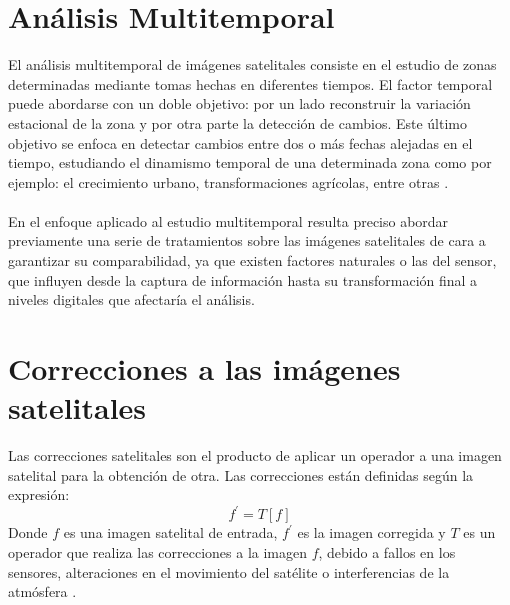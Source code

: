 \section{An\'alisis Multitemporal}
El an\'alisis multitemporal de im\'agenes satelitales consiste en el estudio de zonas determinadas mediante tomas hechas en diferentes tiempos. El factor temporal puede abordarse con un doble objetivo: por un lado reconstruir la variaci\'on estacional de la zona y por otra parte la detecci\'on de cambios. Este \'ultimo objetivo se enfoca en detectar cambios entre dos o m\'as
fechas alejadas en el tiempo, estudiando el dinamismo temporal de una determinada zona como por ejemplo: el crecimiento urbano, transformaciones agr\'icolas, entre otras \cite{salinero2002teledeteccion}.\\~\\
En el enfoque aplicado al estudio multitemporal resulta preciso abordar previamente una serie de tratamientos sobre las im\'agenes satelitales de cara a garantizar su comparabilidad, ya que existen factores naturales o las del sensor, que influyen desde la captura de informaci\'on hasta su transformaci\'on final a niveles digitales que afectar\'ia el an\'alisis.

\section{Correcciones a las im\'agenes satelitales}\label{sec:correcionesImages}
Las correcciones satelitales son el producto de aplicar un operador a una imagen satelital para la obtenci\'on de otra. Las correcciones est\'an definidas seg\'un la expresi\'on:
		\begin{equation}
			f^{'}=T[f]
		\end{equation} 
Donde $ f $ es una imagen satelital de entrada, $ f^{'} $ es la imagen corregida y $ T $ es un operador que realiza las correcciones a la imagen $ f $, debido a fallos en los sensores, alteraciones en el movimiento del sat\'elite o interferencias de la atm\'osfera \cite{teledUm}.
